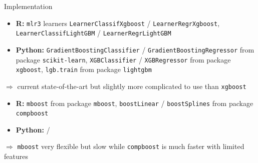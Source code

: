 \begin{frame}{Implementation}

\begin{itemize}
  \item \textbf{R:} \texttt{mlr3} learners \texttt{LearnerClassifXgboost} / 
  \texttt{LearnerRegrXgboost}, \texttt{LearnerClassifLightGBM} / 
  \texttt{LearnerRegrLightGBM}
  \item \textbf{Python:} \texttt{GradientBoostingClassifier} / 
  \texttt{GradientBoostingRegressor} from package \texttt{scikit-learn}, 
  \texttt{XGBClassifier} / \texttt{XGBRegressor} from package \texttt{xgboost},
  \texttt{lgb.train} from package \texttt{lightgbm}
\end{itemize}

$\Rightarrow$  current state-of-the-art but slightly more complicated to use than \texttt{xgboost} 

\medskip

\begin{itemize}
    \item \textbf{R:} \texttt{mboost} from package \texttt{mboost}, 
    \texttt{boostLinear} / \texttt{boostSplines} from package \texttt{compboost}
   \item \textbf{Python:} /
\end{itemize}

$\Rightarrow$ \texttt{mboost} very flexible but slow while \texttt{compboost} is much faster with limited features

\end{frame}



